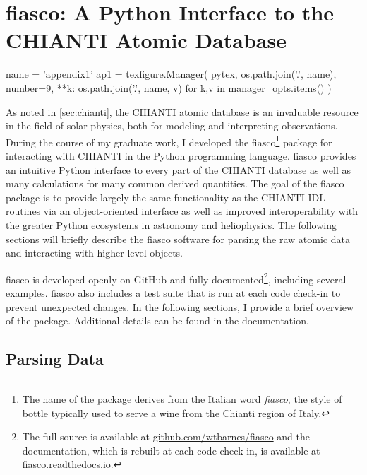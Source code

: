\chapter{fiasco: A Python Interface to the CHIANTI Atomic Database}\label{ap:fiasco}

\begin{pycode}[appendix1]
name = 'appendix1'
ap1 = texfigure.Manager(
    pytex,
    os.path.join('.', name),
    number=9,
    **{k: os.path.join('.', name, v) for k,v in manager_opts.items()}
)
\end{pycode}

As noted in \autoref{sec:chianti}, the CHIANTI atomic database is an invaluable resource in the field of solar physics, both for modeling and interpreting observations. During the course of my graduate work, I developed the fiasco\footnote{The name of the package derives from the Italian word \textit{fiasco}, the style of bottle typically used to serve a wine from the Chianti region of Italy.} package for interacting with CHIANTI in the Python programming language. fiasco provides an intuitive Python interface to every part of the CHIANTI database as well as many calculations for many common derived quantities. The goal of the fiasco package is to provide largely the same functionality as the CHIANTI IDL routines via an object-oriented interface \citep[similar to ChiantiPy][]{landi_chiantiatomic_2012,barnes_chiantipy_2017} as well as improved interoperability with the greater Python ecosystems in astronomy and heliophysics. The following sections will briefly describe the fiasco software for parsing the raw atomic data and interacting with higher-level objects.

fiasco is developed openly on GitHub and fully documented\footnote{The full source is available at \href{https://github.com/wtbarnes/fiasco}{github.com/wtbarnes/fiasco} and the documentation, which is rebuilt at each code check-in, is available at \href{https://fiasco.readthedocs.io/en/latest/}{fiasco.readthedocs.io}.}, including several examples. fiasco also includes a test suite that is run at each code check-in to prevent unexpected changes. In the following sections, I provide a brief overview of the package. Additional details can be found in the documentation.  

\section{Parsing Data}\label{sec:parsing-chianti}

